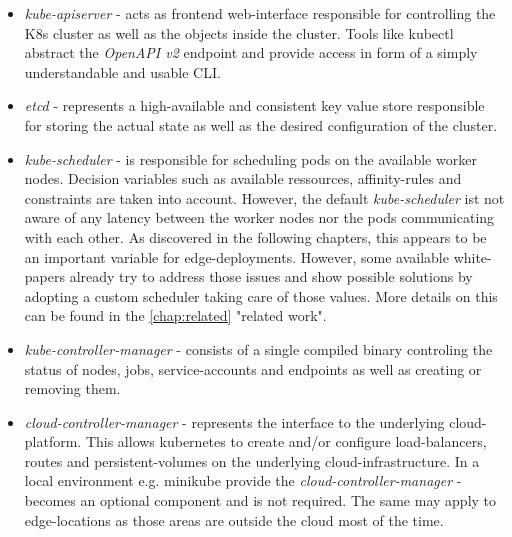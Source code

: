 \documentclass[MSC,Master,english]{twbook}%
\begin{document}
\begin{itemize}
    \item \textit{kube-apiserver} - acts as frontend web-interface responsible for controlling the \ac{K8s} cluster as well as the objects inside the cluster. Tools like kubectl abstract the \textit{OpenAPI v2} endpoint and provide access in form of a simply understandable and usable \ac{CLI}. 
    \item \textit{etcd} - represents a high-available and consistent key value store responsible for storing the actual state as well as the desired configuration of the cluster.
    \item \textit{kube-scheduler} - is responsible for scheduling pods on the available worker nodes. Decision variables such as available ressources, affinity-rules and constraints are taken into account. However, the default \textit{kube-scheduler} ist not aware of any latency between the worker nodes nor the pods communicating with each other. As discovered in the following chapters, this appears to be an important variable for edge-deployments. However, some available white-papers already try to address those issues and show possible solutions by adopting a custom scheduler taking care of those values. More details on this can be found in the \autoref{chap:related} "related work".
    \item \textit{kube-controller-manager} - consists of a single compiled binary controling the status of nodes, jobs, service-accounts and endpoints as well as creating or removing them.
    \item \textit{cloud-controller-manager} - represents the interface to the underlying cloud-platform. This allows kubernetes to create and/or configure load-balancers, routes and persistent-volumes on the underlying cloud-infrastructure. In a local environment e.g. minikube \cite{minikube} provide the \textit{cloud-controller-manager} - becomes an optional component and is not required. The same may apply to edge-locations as those areas are outside the cloud most of the time.
\end{itemize}
\end{document}
